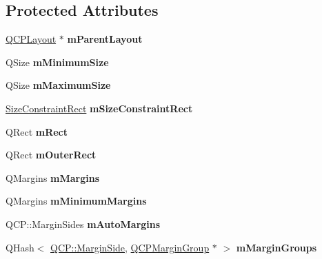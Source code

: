 \subsection*{Protected Attributes}
\begin{DoxyCompactItemize}
\item 
\hyperlink{classQCPLayout}{Q\+C\+P\+Layout} $\ast$ {\bfseries m\+Parent\+Layout}\hypertarget{classQCPLayoutElement_ae7c75c25549608bd688bdb65d4c38066}{}\label{classQCPLayoutElement_ae7c75c25549608bd688bdb65d4c38066}

\item 
Q\+Size {\bfseries m\+Minimum\+Size}\hypertarget{classQCPLayoutElement_affef747c81632de33f08483b7fd10d01}{}\label{classQCPLayoutElement_affef747c81632de33f08483b7fd10d01}

\item 
Q\+Size {\bfseries m\+Maximum\+Size}\hypertarget{classQCPLayoutElement_a64a387973fd4addac842028c89088998}{}\label{classQCPLayoutElement_a64a387973fd4addac842028c89088998}

\item 
\hyperlink{classQCPLayoutElement_a0afb3e5773529e4bd20e448f81be4d2a}{Size\+Constraint\+Rect} {\bfseries m\+Size\+Constraint\+Rect}\hypertarget{classQCPLayoutElement_acc012635b1ae178ff3c4da8a3af303a2}{}\label{classQCPLayoutElement_acc012635b1ae178ff3c4da8a3af303a2}

\item 
Q\+Rect {\bfseries m\+Rect}\hypertarget{classQCPLayoutElement_ad8896f05550389f7b9e92c9e6cdf6e01}{}\label{classQCPLayoutElement_ad8896f05550389f7b9e92c9e6cdf6e01}

\item 
Q\+Rect {\bfseries m\+Outer\+Rect}\hypertarget{classQCPLayoutElement_a07bb4973379e75cb0fa5b032c1d24afd}{}\label{classQCPLayoutElement_a07bb4973379e75cb0fa5b032c1d24afd}

\item 
Q\+Margins {\bfseries m\+Margins}\hypertarget{classQCPLayoutElement_ac2a32b99ee527ca5dfff9da03628fe94}{}\label{classQCPLayoutElement_ac2a32b99ee527ca5dfff9da03628fe94}

\item 
Q\+Margins {\bfseries m\+Minimum\+Margins}\hypertarget{classQCPLayoutElement_a5ba71f25d1af4bb092b28df618538e63}{}\label{classQCPLayoutElement_a5ba71f25d1af4bb092b28df618538e63}

\item 
Q\+C\+P\+::\+Margin\+Sides {\bfseries m\+Auto\+Margins}\hypertarget{classQCPLayoutElement_af61c70354d1275778d68206b2a1b2d36}{}\label{classQCPLayoutElement_af61c70354d1275778d68206b2a1b2d36}

\item 
Q\+Hash$<$ \hyperlink{namespaceQCP_a7e487e3e2ccb62ab7771065bab7cae54}{Q\+C\+P\+::\+Margin\+Side}, \hyperlink{classQCPMarginGroup}{Q\+C\+P\+Margin\+Group} $\ast$ $>$ {\bfseries m\+Margin\+Groups}\hypertarget{classQCPLayoutElement_aeafbbc1130e02eee663c5326761fc963}{}\label{classQCPLayoutElement_aeafbbc1130e02eee663c5326761fc963}

\end{DoxyCompactItemize}
